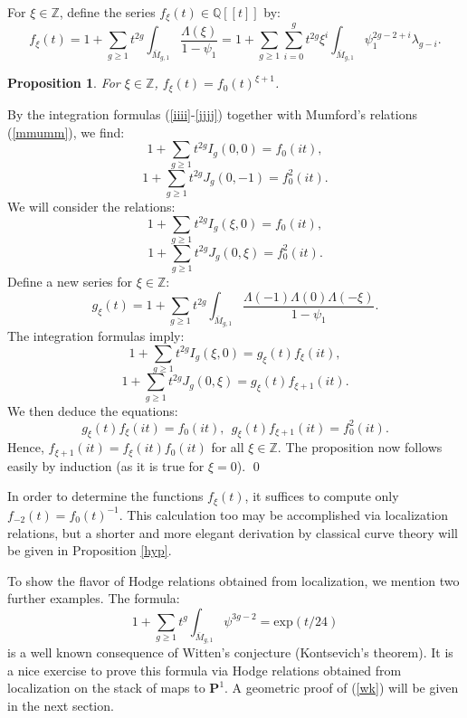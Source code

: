 \documentclass[11 pt]{amsart}
\newtheorem{pr}{Proposition}
\newcommand{\proj}{\mathbf P}
\newcommand{\Q}{\mathbb{Q}}
\newcommand{\Z}{\mathbb{Z}}
\newcommand{\HH}{\Lambda}
\newcommand{\bpf}{\noindent {\em Proof.} }
\newcommand{\epf}{\qed \vspace{+10pt}}
\begin{document}
For $\xi\in \Z$, define the series $f_\xi(t)\in \Q[[t]]$ by:
$$f_\xi(t)=  1+ \sum_{g\geq 1} t^{2g} \int_{\overline{M}_{g,1}}
\frac{\HH(\xi)}{1-\psi_1} =
1 + \sum_{g\geq 1} 
\sum_{i=0}^{g} t^{2g} \xi^i
\int_{\overline{M}_{g,1}} \psi_1^{2g-2+i} \lambda_{g-i}.$$

\begin{pr} \label{fxi}
For $\xi\in \Z$, $f_\xi(t)= f_0(t)^{\xi+1}$.
\end{pr}
\bpf 
By the integration formulas (\ref{iiii}-\ref{jjjj})
together with Mumford's relations
(\ref{mmumm}), we find:
$$ 1+ \sum_{g\geq 1} t^{2g} I_g(0,0) = f_0(it),$$
$$ 1+ \sum_{g \geq 1} t^{2g} J_g(0,-1)= f^2_0(it).$$
We will consider the relations:
$$ 1+ \sum_{g\geq 1} t^{2g} I_g(\xi,0) = f_0(it),$$
$$ 1+ \sum_{g \geq 1} t^{2g} J_g(0,\xi) = f^2_0(it).$$
Define a new series for $\xi\in \Z$:
$$ g_\xi(t)= 1 + \sum_{g\geq 1} t^{2g} \int_{\overline{M}_{g,1}}
\frac{\HH(-1) \HH(0) \HH(-\xi)}{1-\psi_1}.$$
The integration formulas imply:
$$   1+ \sum_{g\geq 1} t^{2g} I_g(\xi,0) = g_\xi(t) f_\xi(it),$$
$$1+ \sum_{g\geq 1} t^{2g} J_g(0,\xi) =   g_\xi(t) f_{\xi+1}(it).$$
We then deduce the equations:
$$ g_\xi(t) f_\xi(it)= f_0(it), \ \ 
g_\xi(t) f_{\xi+1}(it)= f_0^2(it).$$
Hence, $f_{\xi+1}(it)= f_\xi(it) f_0(it)$ for
all $\xi \in \Z$.
The proposition now follows easily 
by induction (as it is true for $\xi=0$).
\epf

In order to determine the functions $f_\xi(t)$, it suffices
to compute only $f_{-2}(t)= f_0(t)^{-1}$. This
calculation too may be accomplished via localization
relations, but a shorter and more elegant derivation
by classical curve theory will be given in Proposition \ref{hyp}.

To show the flavor of Hodge relations obtained from
localization, we mention two further examples.
The formula:
\begin{equation}
\label{wk}
1 + \sum_{g\geq 1} t^g \int_{\overline{M}_{g,1}} \psi^{3g-2} = 
\text{exp}(t/24)
\end{equation}
is a well known consequence of Witten's conjecture (Kontsevich's
theorem). It is a nice exercise to prove this formula
via Hodge relations obtained from localization on the
stack of maps to $\proj^1$. A geometric proof of
(\ref{wk}) will be given in the next section.
\end{document}
